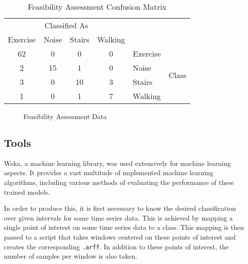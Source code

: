 \begin{table}[]
	\centering
	\begin{tabular}{|cccc|ll|}
		\hline
		\multicolumn{4}{|c|}{Classified As}   &          &                        \\
		Exercise & Noise & Stairs & Walking &          &                        \\
		\hline
		62       & 0     & 0      & 0       & Exercise & \multirow{4}{*}{Class} \\
		2        & 15    & 1      & 0       & Noise    &                        \\
		3        & 0     & 10     & 3       & Stairs   &                        \\
		1        & 0     & 1      & 7       & Walking  &                       \\
		\hline
	\end{tabular}
	\caption{Feasibility Assessment Confusion Matrix \label{tab:first-confusion}}
\end{table}


\begin{figure}
	\centering
	\caption{Feasibility Assessment Data \label{fig:first-data}}
\end{figure}

\subsection{Tools \label{sec:tools}}
Weka, a machine learning library, was used extensively for machine learning aspects. It provides a vast multitude of implemented machine learning algorithms, including various methods of evaluating the performance of these trained models.

In order to produce this, it is first necessary to know the desired classification over given intervals for some time series data. This is achieved by mapping a single point of interest on some time series data to a class. This mapping is then passed to a script that takes windows centered on these points of interest and creates the corresponding \texttt{.arff}. In addition to these points of interest, the number of samples per window is also taken.

